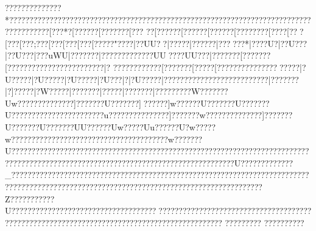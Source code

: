{{{{{{{{{{{{{{{{{{{{{{{{{{{{{{{{{{{{{{{{{{{{{{{{{{{{{{{{{{{{{{{{{{{{{{{{{{{{{{{{{{{{{{{{{{{{{{{{{{{{{{{{{{{{{{{{{{{{{{{{{{{{{{{{{{{{{{{{{{{{{{{{{{{{{{{{{{{{{{{{{{{{{{{{{{{{{{{{{{{{{{{{{{{{{{{{{{{{{{{{{{{{{{{{{{{{{{{{{{{{{{{{{{{{{{{{{{{{{{{{{{{{{{{{{{{{{{{{{{{{{{{{{{{{{{{{{{{{{{{{{{{{{{{{{{{{{{{{{{{{{{{{{{{{{{{{{{{{{{{{{{{{{{{{{{{{{{{{{{{{{{{{{{{{{{{{{{{{{{{{{{{{{{{{{{{{{{{{{{{{{{{{{{{{{{{{{{{{{{{{{{{{{{{{{{{{{{{{{{{{{{{{{{{{{{{{{{{{{{{{{{{{{{{{{{{{{{{{{{{{{{{{{{{{{{{{{{{{{{{{{{{{{{{{{{{{{{{{{{{{{{{{{{{{{{{{{{{{{{{{{{{{{{{{{{{{{{{{{{{{{{{{{{{{{{{{{{{{{{{{{{{{{{{{{{{{{{{{{{{{{{{{{{{{{{{{{{{{{{{{{{{{{{{{{{{{{{{{{{{{{{{{{{{{{{{{{{{{{{{{{{{{{{{{{{{{{{{{{{{{{{{{{{{{{{{{{{{{{{{{{{{{{{{{{{{{{{{{{{{{{{{{{{{{{{{{{{{{{{{{{{{{{{{{{{{{{{{{{{{{{{{{{{{{{{{{{{{{{{{{{{{{{{{{{{{{{{{{{{{{{{{{{{{{{{{{{{{{{{{{{{{{{{{{{{{{{{{{{{{{{{{{{{{{{{{{{{{{{{{{{{{{{{{{{{{{{{{{{{{{{{{{{{{{{{{{{{{{{{{{{{{{{{{{{{{{{{{{{{{{{{{{{{{{{{{{{{{{{{{{{{{{{{{{{{{{{{{{{{{{{{{{{{{{{{{{{{{{{{{{{{{{{{{{{{{{{{{{{{{{{{{{{{{{{{{{{{{{{{{{{{{{{{{{{{{{{{{{{{{{{{{{{{{{{{{{{{{{{{{{{{{{{{{{{{{{{{{{{{{{{{{{{{{{{{{{{{{{{{{{{{{{{{{{{{{{{{{{{{{{{{{{{{{{{{{{{{{{{{{{{{{{{{{{{{{{{{{{{{{{{{{{{{{{{{{{{{{{{{{{{{{{{{{{{{{{{{{{{{{{{{{{{{{{{{{{{{{{{{{{{{{{{{{{{{{{{{{{{{{{{{{{{{{{{{{{{{{{{{{{{{{{{{{{{{{{{{{{{{{{{{{{{{{{{{{{{{{{{{{{{{{{{{{{{{{{{{{{{{{{{{{{{{{{{{{{{{{{{{{{{{{{{{{{{{{{{{{{{{{{{{{{{{{{{{{{{{{{{{{{{{{{{{{{{{{{{{{{{{{{{{{{{{{{{{{{{{{{{{{{{{{{{{{{{{{{{{{{{{{{{{{{{{{{{{{{{{{{{{{{{{{{{{{{{{{{{{{{{{{{{{{{{{{{{{{{{{{{{{{{{{{{{{{{{{{{{{{{{{{{{{{{{{{{{{{{{{{{{{{{{{{{{{{{{{{{{{{{{{{{{{{{{{{{{{{{{{{{{{{{{{{{{{{{{{{{{{{{{{{{{{{{{{{{{{{{{{{{{{{{{{{{{{{{{{{{{{{{{{{{{{{{{{{{{{{{{{{{{{{{{{{{{{{{{{{{{{{{{{{{{{{{{{{{{{{{{{{{{{{{{{{{{{{{{{{{{{{{{{{{{{{{{{{{{{{{{{{{{{{{{{{{{{{{{{{{{{{{{{{{{{{{{{{{{{{{{{{{{{{{{{{{{{{{{{{{{{{{{{{{{{{{{{{{{{{{{{??????????????*?????????????????????????????????????????????????????????????????????????????????????{?[???*?[?{?????[?{?????{?[???
?{?[?????{?[?????{?[?????{?[???  {?{???  {?[???  {?[??  {?[??   {?[??   {?;??   {?[??   {?[??   {?[??   {?[??   {?{??"  {?{???  |?{?UU?{?|? ???{?|?????{?|????{?{?*   |?{???U?|?{?U???|?{?U???|?{??uWU|?{?????{?|???????{?????{?UU???{?UU??{?|???????[???????[???????{?????{???????{????{?|?
?????{???????[???????[?????[???????{???????{??????|?U?????|?U?????|?U?????|?U???|?|?U?????|???????{?????{???????{???????|???????|?]?????|?W?????|???????|?????|???????|?????????W???????Uw??????????????]???????U???????]??????]w??????U???????U???????U???????????????????????u???????????????]???????w???????}???????]???????U???????U???????UU??????Uw}?????Uu??????U?w?????w???????????????????????????????????????w???????U???????????????????????????????????????????????????????????????????????????????????????????????????????????????????????????????????U?????????????_??????????????????????????????????????????????????????????????????????????????????????????????????????????????????????????????????????????Z???????????U???? ?????????????????????????????????????? ?????? ???? ????? ????? ????? ????? ????? ????? ????? ????? ????? ????? ?????????????????????? ????
 ????? ????
 ????  ?????? }}}}}}}}}}}}}}}}}}}}}}}}}}}}}}}}}}}}}}}}}}}}}}}}}}}}}}}}}}}}}}}}}}}}}}}}}}}}}}}}}}}}}}}}}}}}}}}}}}}}}}}}}}}}}}}}}}}}}}}}}}}}}}}}}}}}}}}}}}}}}}}}}}}}}}}}}}}}}}}}}}}}}}}}}}}}}}}}}}}}}}}}}}}}}}}}}}}}}}}}}}}}}}}}}}}}}}}}}}}}}}}}}}}}}}}}}}}}}}}}}}}}}}}}}}}}}}}}}}}}}}}}}}}}}}}}}}}}}}}}}}}}}}}}}}}}}}}}}}}}}}}}}}}}}}}}}}}}}}}}}}}}}}}}}}}}}}}}}}}}}}}}}}}}}}}}}}}}}}}}}}}}}}}}}}}}}}}}}}}}}}}}}}}}}}}}}}}}}}}}}}}}}}}}}}}}}}}}}}}}}}}}}}}}}}}}}}}}}}}}}}}}}}}}}}}}}}}}}}}}}}}}}}}}}}}}}}}}}}}}}}}}}}}}}}}}}}}}}}}}}}}}}}}}}}}}}}}}}}}}}}}}}}}}}}}}}}}}}}}}}}}}}}}}}}}}}}}}}}}}}}}}}}}}}}}}}}}}}}}}}}}}}}}}}}}}}}}}}}}}}}}}}}}}}}}}}}}}}}}}}}}}}}}}}}}}}}}}}}}}}}}}}}}}}}}}}}}}}}}}}}}}}}}}}}}}}}}}}}}}}}}}}}}}}}}}}}}}}}}}}}}}}}}}}}}}}}}}}}}}}}}}}}}}}}}}}}}}}}}}}}}}}}}}}}}}}}}}}}}}}}}}}}}}}}}}}}}}}}}}}}}}}}}}}}}}}}}}}}}}}}}}}}}}}}}}}}}}}}}}}}}}}}}}}}}}}}}}}}}}}}}}}}}}}}}}}}}}}}}}}}}}}}}}}}}}}}}}}}}}}}}}}}}}}}}}}}}}}}}}}}}}}}}}}}}}}}}}}}}}}}}}}}}}}}}}}}}}}}}}}}}}}}}}}}}}}}}}}}}}}}}}}}}}}}}}}}}}}}}}}}}}}}}}}}}}}}}}}}}}}}}}}}}}}}}}}}}}}}}}}}}}}}}}}}}}}}}}}}}}}}}}}}}}}}}}}}}}}}}}}}}}}}}}}}}}}}}}}}}}}}}}}}}}}}}}}}}}}}}}}}}}}}}}}}}}}}}}}}}}}}}}}}}}}}}}}}}}}}}}}}}}}}}}}}}}}}}}}}}}}}}}}}}}}}}}}}}}}}}}}}}}}}}}}}}}}}}}}}}}}}}}}}}}}}}}}}}}}}}}}}}}}}}}}}}}}}}}}}}}}}}}}}}}}}}}}}}}}}}}}}}}}}}}}}}}}}}}}}}}}}}}}}}}}}}}}}}}}}}}}}}}}}}}}}}}}}}}}}}}}}}}}}}}}}}}}}}}}}}}}}}}}}}}}}}}}}}}}}}}}}}}}}}}}}}}}}}}}}}}}}}}}}}}}}}}}}}}}}}}}}}}}}}}}}}}}}}}}}}}}}}}}}}}}}}}}}}}}}}}}}}}}}}}}}}}}}}}}}}}}}}}}}}}}}}}}}}}}}}}}}}}}}}}}}}}}}}}}}}}}}}}}}}}}}}}}}}}}}}}}}}}}}}}}}}}}}}}}}}}}}}}}}}}}}}}}}}}}}}}}}}}}}}}}}}}}}}}}}}}}}}}}}}}}}}}}}}}}}}}}}}}}}}}}}}}}}}}}}}}}}}}}}}}}}}}}}}}}}}}}}}}}}}}}}}}}}}}}}}}}}}}}}}}}}}}}}}}}}}}}}}}}}}}}}}}}}}}}}}}}}}}}}}}}}}}}}}}}}}}}}}}}}}}}}}}}}}}}}}}}}}}}}}}}}}}}}}}}}}}}}}}}}}}}}}}}}}}}}}}}}}}}}}}}}}}}}}}}}}}}}}}}}}}}}}}}}}}}}}}}}}}}}}}}}}}}}}}}}}}}
